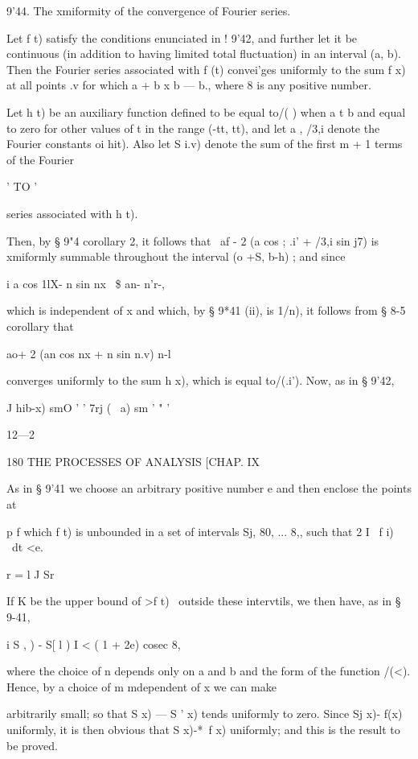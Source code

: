 9'44. The xmiformity of the convergence of Fourier series.

Let f t) satisfy the conditions enunciated in ! 9'42, and further let
it be continuous (in addition to having limited total fluctuation) in
an interval (a, b). Then the Fourier series associated with f (t)
convei'ges uniformly to the sum f x) at all points .v for which a + b
x b — b., where 8 is any positive number.

Let h t) be an auxiliary function defined to be equal to/( ) when a t
b and equal to zero for other values of t in the range (-tt, tt), and
let a , /3,i denote the Fourier constants oi hit). Also let S i.v)
denote the sum of the first m + 1 terms of the Fourier

  ' TO '

series associated with h t).

Then, by § 9"4 corollary 2, it follows that \ af - 2 (a cos ; .i' +
/3,i sin j7) is xmiformly summable throughout the interval (o +S, b-h)
; and since

i a cos 1lX- n sin nx \ \$ an- n'r-,

which is independent of x and which, by § 9*41 (ii), is 1/n), it
follows from § 8-5 corollary that

 ao+ 2 (an cos nx + n sin n.v) n-l

converges uniformly to the sum h x), which is equal to/(.i'). Now, as
in § 9'42,

   J hib-x) smO ' ' 7rj ( \ a) sm ' " '

12—2



180 THE PROCESSES OF ANALYSIS [CHAP. IX

As in § 9'41 we choose an arbitrary positive number e and then enclose
the points at

p f which f t) is unbounded in a set of intervals Sj, 80, ... 8,, such
that 2 I \ f i) \ dt <e.

r = l J Sr

If K be the upper bound of >f t) \ outside these intervtils, we then
have, as in § 9-41,

i S , ) - S[ l ) I < ( 1 + 2e) cosec 8,

where the choice of n depends only on a and b and the form of the
function /(<). Hence, by a choice of m mdependent of x we can make

arbitrarily small; so that S x) — S ' x) tends uniformly to zero.
Since Sj x)- f(x) uniformly, it is then obvious that S x)-*~f x)
uniformly; and this is the result to be proved.

